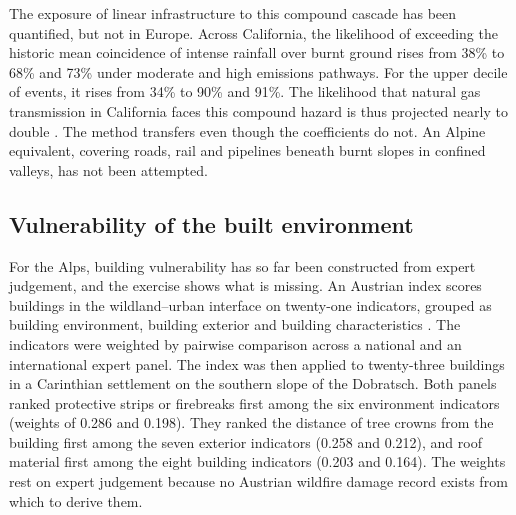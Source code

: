 \documentclass[11pt,a4paper]{article}
\begin{document}
The exposure of linear infrastructure to this compound cascade has been quantified, but not in Europe. Across California, the likelihood of exceeding the historic mean coincidence of intense rainfall over burnt ground rises from 38\% to 68\% and 73\% under moderate and high emissions pathways. For the upper decile of events, it rises from 34\% to 90\% and 91\%. The likelihood that natural gas transmission in California faces this compound hazard is thus projected nearly to double \citep{moftakhari_increasing_2019}. The method transfers even though the coefficients do not. An Alpine equivalent, covering roads, rail and pipelines beneath burnt slopes in confined valleys, has not been attempted.

\subsection{Vulnerability of the built environment}

For the Alps, building vulnerability has so far been constructed from expert judgement, and the exercise shows what is missing. An Austrian index scores buildings in the wildland--urban interface on twenty-one indicators, grouped as building environment, building exterior and building characteristics \citep{papathomakohle_towards_2025}. The indicators were weighted by pairwise comparison across a national and an international expert panel. The index was then applied to twenty-three buildings in a Carinthian settlement on the southern slope of the Dobratsch. Both panels ranked protective strips or firebreaks first among the six environment indicators (weights of 0.286 and 0.198). They ranked the distance of tree crowns from the building first among the seven exterior indicators (0.258 and 0.212), and roof material first among the eight building indicators (0.203 and 0.164). The weights rest on expert judgement because no Austrian wildfire damage record exists from which to derive them.
\end{document}
